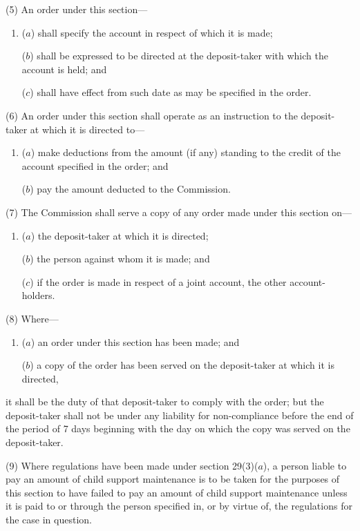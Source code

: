 \documentclass[12pt,a4paper]{article}
\begin{document}
(5) An order under this section---
\begin{enumerate}\item[]
($a$) shall specify the account in respect of which it is made;

($b$) shall be expressed to be directed at the deposit-taker with which the account is held; and

($c$) shall have effect from such date as may be specified in the order.
\end{enumerate}

(6) An order under this section shall operate as an instruction to the deposit-taker at which it is directed to---
\begin{enumerate}\item[]
($a$) make deductions from the amount (if any) standing to the credit of the account specified in the order; and

($b$) pay the amount deducted to the Commission.
\end{enumerate}

(7) The Commission shall serve a copy of any order made under this section on---
\begin{enumerate}\item[]
($a$) the deposit-taker at which it is directed;

($b$) the person against whom it is made; and

($c$) if the order is made in respect of a joint account, the other account-holders.
\end{enumerate}

(8)
Where---
\begin{enumerate}\item[]
($a$)
an order under this section has been made; and

($b$)
a copy of the order has been served on the deposit-taker at which it is directed, 
\end{enumerate}
it shall be the duty of that deposit-taker to comply with the order; but the deposit-taker shall not be under any liability for non-compliance before the end of the period of 7 days beginning with the day on which the copy was served on the deposit-taker.

\begin{sloppypar}
(9)
Where regulations have been made under section 29(3)($a$), a person liable to pay an amount of child support maintenance is to be taken for the purposes of this section to have failed to pay an amount of child support maintenance unless it is paid to or through the person specified in, or by virtue of, the regulations for the case in question.
\end{sloppypar}
\end{document}
